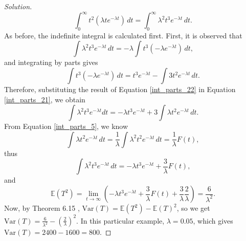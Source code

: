 \documentclass[letterpaper, 10 pt, conference]{article}
\newcommand\E{\ensuremath{\mathbb{E}}}
\newcommand\V{\ensuremath{\mathrm{Var}}}
\begin{document}
\begin{proof}[Solution]
\begin{equation}
		\int_{0}^{\infty} t^2(\lambda t e^{-\lambda t}) \, dt = \int_{0}^{\infty} \lambda^2 t^3 e^{-\lambda t} \, dt.
	\end{equation}
	As before, the indefinite integral is calculated first. First, it is observed that
	\begin{equation}\label{int_parts_21}
		 \int \lambda^2 t^3 e^{-\lambda t} \, dt = -\lambda \int t^3 (-\lambda e^{-\lambda t} )\, dt,
	\end{equation}
	and integrating by parts gives
	\begin{equation}\label{int_parts_22}
		\int t^3 (-\lambda e^{-\lambda t} )\, dt = t^3 e^{-\lambda t} - \int 3 t^2 e^{-\lambda t} \, dt.
	\end{equation}
	Therefore, substituting the result of Equation \ref{int_parts_22} in Equation \ref{int_parts_21}, we obtain
	\begin{equation}\label{int_parts_23}
		\int \lambda^2 t^3 e^{-\lambda t} dt = -\lambda t^3 e^{-\lambda t} + 3 \int \lambda t^2 e^{-\lambda t} \, dt.
	\end{equation}
 	From Equation \ref{int_parts_5}, we know
	\begin{equation}
		\int \lambda t^2 e^{-\lambda t} \, dt = \frac{1}{\lambda} \int \lambda^2 t^2 e^{-\lambda t} \, dt =  \frac{1}{\lambda} F(t),
	\end{equation}
	thus
	\begin{equation}
		\int \lambda^2 t^3 e^{-\lambda t} \, dt = -\lambda t^3 e^{-\lambda t} + \frac{3}{\lambda} F(t), 
	\end{equation}
	and
	\begin{equation}
		\E(T^2) = \lim_{t \longrightarrow \infty} (-\lambda t^3 e^{-\lambda t} + \frac{3}{\lambda} F(t) + \frac{3}{\lambda} \frac{2}{\lambda}) = \frac{6}{\lambda^2}.
	\end{equation} 
	Now, by Theorem 6.15 \citep{snell}, $\V(T) = \E(T^2) - \E(T)^2$, so we get $\V(T) = \frac{6}{\lambda^2} - (\frac{2}{\lambda})^2$. In this particular example, $\lambda = 0.05$, which gives $\V(T) = 2400-1600=800$.
\end{proof}
\end{document}
